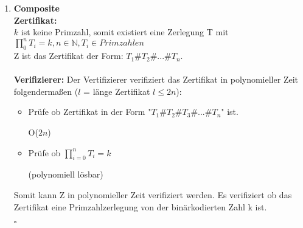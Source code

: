 \documentclass{article}
\begin{document}
\begin{enumerate}[label=(\alph*).]
		\item \textbf{Composite}\\
		\textbf{Zertifikat:}\\
		$k$ ist keine Primzahl, somit existiert eine Zerlegung T mit $\prod_0^n T_i = k , n \in \mathbb{N}, T_i \in Primzahlen$ \\
		Z ist das Zertifikat der Form: $T_1\#T_2\#...\#T_n$.\\\\
		\textbf{Verifizierer:}
		Der Vertifizierer verifiziert das Zertifikat in polynomieller Zeit folgendermaßen ($l$ = länge Zertifikat $l \leq 2n$):\\
		\begin{itemize}
			\item Prüfe ob Zertifikat in der Form "$T_1\#T_2\#T_3\#...\#T_n$" ist. \begin{flushright}O($2n$)\end{flushright}
			\item Prüfe ob $\prod_{i=0}^{n} T_i = k$
			\begin{flushright}(polynomiell lösbar)\end{flushright}
		\end{itemize}
		Somit kann Z in polynomieller Zeit verifiziert werden. Es verifiziert ob das Zertifikat eine Primzahlzerlegung von der binärkodierten Zahl k ist.
		\begin{flushright}$\square$\end{flushright}



\end{enumerate}
\end{document}
